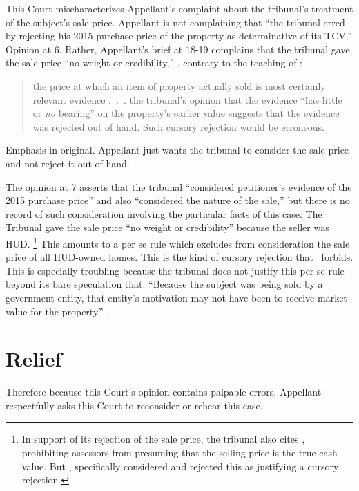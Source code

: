 \documentclass[12pt,\documentclassflag]{michiganCourtOfAppealsBrief}
\begin{document}
This Court mischaracterizes Appellant's complaint about the tribunal's treatment of the subject's sale price. Appellant is not complaining that ``the tribunal erred by rejecting his 2015 purchase price of the
property as determinative of its TCV.'' Opinion at 6. Rather, Appellant's brief at 18-19 complains that the tribunal gave the sale price ``no weight or credibility,'' \reconsiderationDenied[2], contrary to the teaching of :

\begin{quotation}
  the price at which an item of
  property actually sold is most certainly relevant evidence .~.~.
  the tribunal's opinion that the evidence ``has little or \emph{no}
bearing'' on the property's earlier value suggests that the evidence was rejected out of hand. Such cursory rejection would be erroneous.
\end{quotation}
Emphasis in original. Appellant just wants the tribunal to consider the sale price and not reject it out of hand.

The opinion at 7 asserts that the tribunal ``considered petitioner's evidence of the 2015 purchase price'' and also ``considered the nature of the sale,'' but there is no record of such consideration involving the particular facts of this case. 
The Tribunal gave the sale price ``no weight or credibility'' because the seller was HUD.%
\footnote{In support of its rejection of the sale price, the tribunal also cites \cite[s]{MCL 211.27(6)}, prohibiting assessors from presuming that the selling price is the true cash value. But , specifically considered and rejected this as justifying a cursory rejection.}
This amounts to a per se rule which excludes from consideration the sale price of all HUD-owned homes. This is the kind of cursory rejection that \cite[s]{Jones & Laughlin}\ forbids. This is especially troubling because the tribunal does not justify this per se rule beyond its bare speculation that: ``Because the subject was being sold by a government entity, that entity's motivation may
not have been to receive market value for the property.'' \reconsiderationDenied[2].

\section{Relief}

Therefore because this Court's opinion contains palpable errors, Appellant respectfully asks this Court to reconsider or rehear this case.
\end{document}
